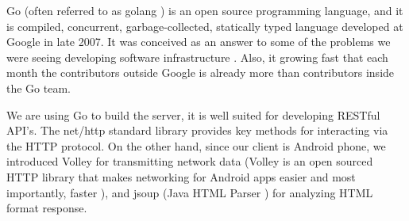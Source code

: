 Go (often referred to as golang \cite{google.golang.2016}) is an open source programming language, and it is compiled, concurrent, garbage-collected, statically typed language developed at Google in late 2007. It was conceived as an answer to some of the problems we were seeing developing software infrastructure \cite{google.talk-golang.2012}. Also, it growing fast that each month the contributors outside Google is already more than contributors inside the Go team.

We are using Go to build the server, it is well suited for developing RESTful API’s. The net/http standard library provides key methods for interacting via the HTTP protocol. On the other hand, since our client is Android phone, we introduced Volley for transmitting network data (Volley is an open sourced HTTP library that makes networking for Android apps easier and most importantly, faster \cite{google.volley.2016}), and jsoup (Java HTML Parser \cite{joup.2016}) for analyzing HTML format response.

